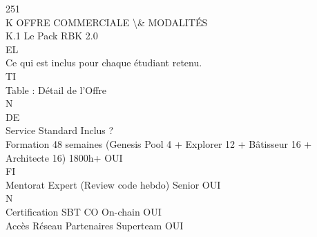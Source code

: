 \documentclass[12pt,landscape,a4paper]{article}
\begin{document}
\vspace{0.5em}
\vspace{0.5em}
\vspace{0.5em}
\vspace{0.5em}
251\\
K \textbar{} OFFRE COMMERCIALE \textbackslash{}& MODALITÉS\\
\vspace{0.5em}
\vspace{0.5em}
K.1 Le Pack RBK 2.0\\
\vspace{0.5em}
\vspace{0.5em}
\vspace{0.5em}
\vspace{0.5em}
EL\\
Ce qui est inclus pour chaque étudiant retenu.\\
\vspace{0.5em}
\vspace{0.5em}
\vspace{0.5em}
\vspace{0.5em}
TI\\
Table : Détail de l’Offre\\
\vspace{0.5em}
\vspace{0.5em}
\vspace{0.5em}
\vspace{0.5em}
N\\
DE\\
Service                                                                             Standard Inclus ?\\
Formation 48 semaines (Genesis Pool 4 + Explorer 12 + Bâtisseur 16 + Architecte 16) 1800h+ OUI\\
\vspace{0.5em}
\vspace{0.5em}
\vspace{0.5em}
\vspace{0.5em}
FI\\
Mentorat Expert (Review code hebdo)                                                 Senior    OUI\\
\vspace{0.5em}
\vspace{0.5em}
\vspace{0.5em}
N\\
Certification SBT                  CO                                               On-chain OUI\\
Accès Réseau Partenaires                                                            Superteam OUI\\
\end{document}
